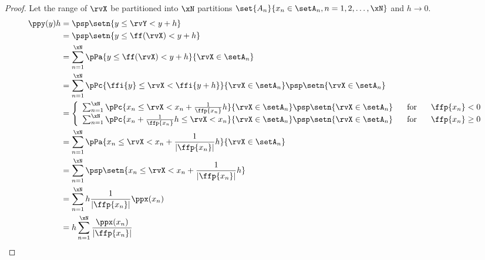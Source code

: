 \begin{theorem}
\label{thm:Y=f(X)}
\end{theorem}
\begin{proof}
Let the range of $\rvX$ be partitioned into $\xN$ partitions
$\set{A_n}{x_n\in\setA_n, n=1,2,\ldots,\xN}$ and $h\to0$.
\begin{align*}
  \ppy(y)h
    &= \psp\setn{y \le\rvY < y+h}
  \\&= \psp\setn{y \le \ff(\rvX) < y+h}
  \\&= \sum_{n=1}^{\xN} \pPa{y \le \ff(\rvX) < y+h}{\rvX\in\setA_n}
  \\&= \sum_{n=1}^{\xN} \pPc{\ffi{y} \le\rvX < \ffi{y+h}}{\rvX\in\setA_n}\psp\setn{\rvX\in\setA_n}
  \\&= \left\{\begin{array}{l@{\hspace{4ex}\mbox{for}\hspace{4ex}}l}
         \sum_{n=1}^{\xN} \pPc{x_n     \le\rvX < x_n + \frac{1}{\ffp{x_n}}h}{\rvX\in\setA_n}\psp\setn{\rvX\in\setA_n} & \ffp{x_n}<0 \\
         \sum_{n=1}^{\xN} \pPc{x_n + \frac{1}{\ffp{x_n}}h \le\rvX < x_n}{\rvX\in\setA_n}\psp\setn{\rvX\in\setA_n}     & \ffp{x_n}\ge0
       \end{array}\right.
  \\&= \sum_{n=1}^{\xN} \pPa{x_n     \le\rvX < x_n + \frac{1}{|\ffp{x_n}|}h}{\rvX\in\setA_n}
  \\&= \sum_{n=1}^{\xN} \psp\setn{x_n     \le\rvX < x_n + \frac{1}{|\ffp{x_n}|}h}
  \\&= \sum_{n=1}^{\xN} h \frac{1}{|\ffp{x_n}|} \ppx(x_n)
  \\&= h \sum_{n=1}^{\xN} \frac{\ppx(x_n)}{|\ffp{x_n}|}
\end{align*}
\end{proof}

